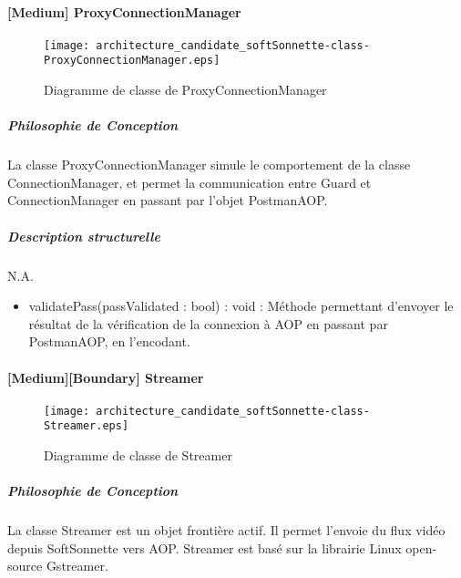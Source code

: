 \newpage

    \paragraph{[Medium] ProxyConnectionManager}

        \begin{figure} [H]
            \centering
            \texttt{[image: architecture\_candidate\_softSonnette-class-ProxyConnectionManager.eps]}
            \caption{Diagramme de classe de ProxyConnectionManager}
            \label{Classe-ProxyConnectionManager}
        \end{figure}

        \subparagraph{Philosophie de Conception}%

        La classe ProxyConnectionManager simule le comportement de la classe ConnectionManager, et permet la communication entre Guard et ConnectionManager en passant par l'objet PostmanAOP.
        
        \subparagraph{Description structurelle}%

                N.A. 
            \begin{itemize}
                \item {validatePass(passValidated : bool) : void : Méthode permettant d'envoyer le résultat de la vérification de la connexion à AOP en passant par PostmanAOP, en l'encodant.}
            \end{itemize}
            \newpage

    \paragraph{[Medium][Boundary] Streamer}

        \begin{figure} [H]
            \centering
            \texttt{[image: architecture\_candidate\_softSonnette-class-Streamer.eps]}
            \caption{Diagramme de classe de Streamer}
            \label{Classe-Streamer}
        \end{figure}

        \subparagraph{Philosophie de Conception}%

        La classe Streamer est un objet frontière actif.
        Il permet l'envoie du flux vidéo depuis SoftSonnette vers AOP.
        Streamer est basé sur la librairie Linux open-source Gstreamer.
        

